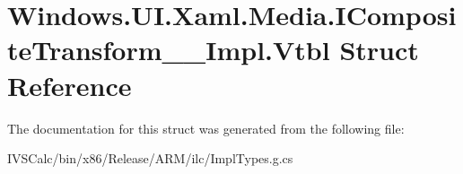 \hypertarget{struct_windows_1_1_u_i_1_1_xaml_1_1_media_1_1_i_composite_transform_____impl_1_1_vtbl}{}\section{Windows.\+U\+I.\+Xaml.\+Media.\+I\+Composite\+Transform\+\_\+\+\_\+\+Impl.\+Vtbl Struct Reference}
\label{struct_windows_1_1_u_i_1_1_xaml_1_1_media_1_1_i_composite_transform_____impl_1_1_vtbl}


The documentation for this struct was generated from the following file\+:\begin{DoxyCompactItemize}
\item 
I\+V\+S\+Calc/bin/x86/\+Release/\+A\+R\+M/ilc/Impl\+Types.\+g.\+cs\end{DoxyCompactItemize}
